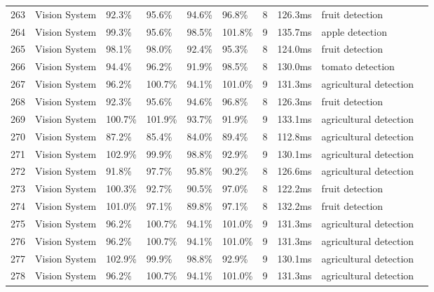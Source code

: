 \begin{table*}[htbp]
\begin{tabular}{p{}p{}p{}p{}p{}p{}p{}p{}p{}p{}}
 263 & Vision System & 92.3\% & 95.6\% & 94.6\% & 96.8\% & 8 & 126.3ms & fruit detection & \cite{wang2023biologically} \\
 264 & Vision System & 99.3\% & 95.6\% & 98.5\% & 101.8\% & 9 & 135.7ms & apple detection & \cite{li2023multi} \\
 265 & Vision System & 98.1\% & 98.0\% & 92.4\% & 95.3\% & 8 & 124.0ms & fruit detection & \cite{liu2024hierarchical} \\
 266 & Vision System & 94.4\% & 96.2\% & 91.9\% & 98.5\% & 8 & 130.0ms & tomato detection & \cite{chen2024mlp} \\
 267 & Vision System & 96.2\% & 100.7\% & 94.1\% & 101.0\% & 9 & 131.3ms & agricultural detection & \cite{ge2024multi} \\
 268 & Vision System & 92.3\% & 95.6\% & 94.6\% & 96.8\% & 8 & 126.3ms & fruit detection & \cite{abdulsalam2023fruity} \\
 269 & Vision System & 100.7\% & 101.9\% & 93.7\% & 91.9\% & 9 & 133.1ms & agricultural detection & \cite{sadeghian2025reliability} \\
 270 & Vision System & 87.2\% & 85.4\% & 84.0\% & 89.4\% & 8 & 112.8ms & agricultural detection & \cite{ronneberger2015u} \\
 271 & Vision System & 102.9\% & 99.9\% & 98.8\% & 92.9\% & 9 & 130.1ms & agricultural detection & \cite{xie2021segformer} \\
 272 & Vision System & 91.8\% & 97.7\% & 95.8\% & 90.2\% & 8 & 126.6ms & agricultural detection & \cite{vougioukas2019orchestra} \\
 273 & Vision System & 100.3\% & 92.7\% & 90.5\% & 97.0\% & 8 & 122.2ms & fruit detection & \cite{verbiest2022path} \\
 274 & Vision System & 101.0\% & 97.1\% & 89.8\% & 97.1\% & 8 & 132.2ms & fruit detection & \cite{burks2021engineering} \\
 275 & Vision System & 96.2\% & 100.7\% & 94.1\% & 101.0\% & 9 & 131.3ms & agricultural detection & \cite{heschl2024synthset} \\
 276 & Vision System & 96.2\% & 100.7\% & 94.1\% & 101.0\% & 9 & 131.3ms & agricultural detection & \cite{10518056} \\
 277 & Vision System & 102.9\% & 99.9\% & 98.8\% & 92.9\% & 9 & 130.1ms & agricultural detection & \cite{9330509} \\
 278 & Vision System & 96.2\% & 100.7\% & 94.1\% & 101.0\% & 9 & 131.3ms & agricultural detection & \cite{10497583} \\
\bottomrule
\end{tabular}
\end{table*}